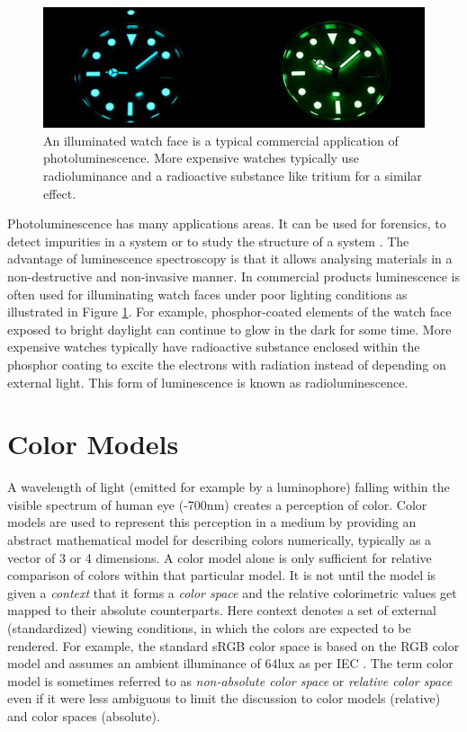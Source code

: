 \documentclass[thesis.tex]{subfiles}
\begin{document}
\begin{figure}[ht]
\centering \includegraphics[width=\textwidth]{images/photoluminescence_example}
\caption{An illuminated watch face is a typical commercial application of photoluminescence. More expensive watches typically use radioluminance and a radioactive substance like tritium for a similar effect.\label{figure:photoluminescence_example}}
\end{figure}

Photoluminescence has many applications areas. It can be used for forensics, to detect impurities in a system or to study the structure of a system \cite{photoluminescence_use_case_2}\cite{photoluminescence_use_case_1}\cite{photoluminescence_use_case_3}. The advantage of luminescence spectroscopy is that it allows analysing materials in a non-destructive and non-invasive manner. In commercial products luminescence is often used for illuminating watch faces under poor lighting conditions as illustrated in Figure \ref{figure:photoluminescence_example}. For example, phosphor-coated elements of the watch face exposed to bright daylight can continue to glow in the dark for some time. More expensive watches typically have radioactive substance enclosed within the phosphor coating to excite the electrons with radiation instead of depending on external light. This form of luminescence is known as radioluminescence.

\section{Color Models}
\label{section:rgbhsv}

A wavelength of light (emitted for example by a luminophore) falling within the visible spectrum of human eye (-700nm) creates a perception of color. Color models are used to represent this perception in a medium by providing an abstract mathematical model for describing colors numerically, typically as a vector of 3 or 4 dimensions. A color model alone is only sufficient for relative comparison of colors within that particular model. It is not until the model is given a \textit{context} that it forms a \textit{color space} and the relative colorimetric values get mapped to their absolute counterparts. Here context denotes a set of external (standardized) viewing conditions, in which the colors are expected to be rendered. For example, the standard sRGB color space is based on the RGB color model and assumes an ambient illuminance of 64lux as per IEC \cite{iec}. The term color model is sometimes referred to as \textit{non-absolute color space} or \textit{relative color space} even if it were less ambiguous to limit the discussion to color models (relative) and color spaces (absolute).
\end{document}
